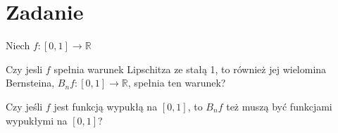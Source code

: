 \documentclass[11pt]{scrartcl}
\begin{document}
        \section{Zadanie}
            \begin{zadanie}
              Niech $f : [0,1] \to \mathbb{R} $
              \begin{walk}
                  \item Czy jesli $f$ spełnia warunek Lipschitza ze stałą 1, to również jej wielomina Bernsteina, $B_nf : [0, 1] \to \mathbb{R} $, spełnia ten warunek?
                  \item Czy jeśli $f$ jest funkcją wypukłą na $[0, 1]$, to $B_nf$ też muszą być funkcjami wypukłymi na $[0, 1]$?
              \end{walk}
              
            \end{zadanie}
            
\end{document}
